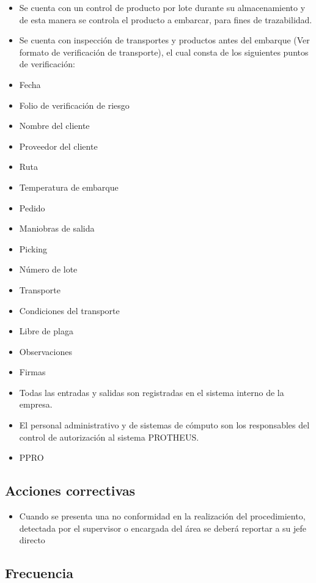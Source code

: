 \begin{itemize}
	\item Se cuenta con un control de producto por lote durante su almacenamiento y de esta manera se controla el producto a embarcar, para fines de trazabilidad.
	\item Se cuenta con inspección de transportes y productos antes del embarque (Ver formato de verificación de transporte), el cual consta de los siguientes puntos de verificación:
	\item Fecha
	\item Folio de verificación de riesgo
	\item Nombre del cliente
	\item Proveedor del cliente
	\item Ruta
	\item Temperatura de embarque
	\item Pedido
	\item Maniobras de salida
	\item Picking
	\item Número de lote
	\item Transporte
	\item Condiciones del transporte
	\item Libre de plaga
	\item Observaciones
	\item Firmas
	\item Todas las entradas y salidas son registradas en el sistema interno de la empresa.
	\item El personal administrativo y de sistemas de cómputo son los responsables del control de autorización al sistema PROTHEUS.
	\item \gls{PPRO}
\end{itemize}

\subsection{Acciones correctivas}

\begin{itemize}
	\item Cuando se presenta una no conformidad en la realización del procedimiento, detectada por el supervisor o encargada del área se deberá reportar a su jefe directo
\end{itemize}

\subsection{Frecuencia}


